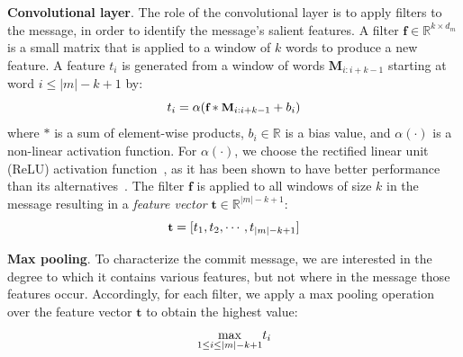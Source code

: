 \textbf{Convolutional layer}. The role of the convolutional layer is to apply
filters to the message, in order to identify the message's salient
features.  
A filter $\textbf{f} \in \mathbb{R}^{k \times d_m}$ is
a small matrix 
that is applied
to a window of $k$ words to produce a new feature. A feature $t_i$ is generated from a window of words
$\textbf{M}_{i:i+k-1}$ starting at word $i \leq |m|- k + 1$ by:
\begin{equation} \footnotesize
\label{eq:filtering}
t_i = \alpha ( \textbf{f} \ast \textbf{M}_{i:i+k-1} + b_i) 
\end{equation}
where $\ast$ is a sum of element-wise products, $b_i \in
\mathbb{R}$ is a bias value, and $\alpha(\cdot)$ is a non-linear activation
function. For $\alpha(\cdot)$, we choose the rectified linear unit (ReLU) activation function~\cite{nair2010rectified}, as it has been shown to have better performance than 
its alternatives~\cite{anastassiou2011univariate,dahl2013improving}.
The filter $\textbf{f}$ is applied to all windows of size $k$ in the message resulting in a \textit{feature vector} $\textbf{t} \in \mathbb{R}^{|m|-k+1}$:
\begin{equation} \footnotesize
\label{eq:ftr_vector}
\textbf{t} = [t_1, t_2, \cdots, t_{|m|-k+1}]
\end{equation}


\textbf{Max pooling}. 
To characterize the commit message, we are interested in the degree to
which it contains various features, but not where in the message those
features occur. Accordingly, for each filter,
we apply a max pooling operation~\cite{collobert2011natural} over the feature vector $\textbf{t}$ to obtain the highest value:
\begin{equation} \footnotesize
\label{eq:pooling}
\underset{1 \leq i \leq |m|-k+1}{\max} t_i
\end{equation}

